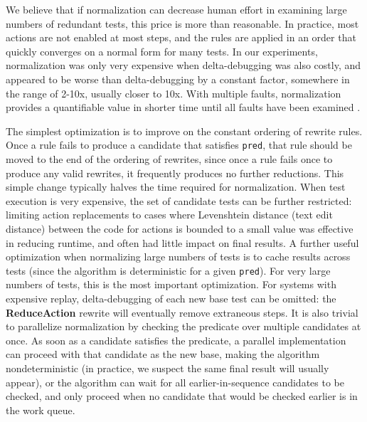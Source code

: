 We believe that if normalization can decrease human effort in
examining large numbers of redundant tests, this price is more
than reasonable.  In practice, most actions are not enabled at most
steps, and the rules are applied in an order that quickly converges on
a normal form for many tests.  In our experiments, normalization
was only very expensive when delta-debugging was also costly, and
appeared to be worse than delta-debugging by a constant factor,
somewhere in the range of 2-10x, usually closer to 10x.  With multiple
faults, normalization provides a quantifiable value in
shorter time until all faults have been examined \cite{PLDI13}.


The simplest optimization is to improve on the constant ordering of
rewrite rules.  Once a rule fails to produce a candidate that
satisfies {\tt pred}, that rule should be moved to the end of the
ordering of rewrites, since once a rule fails once to produce any
valid rewrites, it frequently produces no further reductions.  This
simple change typically halves the time required for normalization.
When test execution is very expensive, the set of candidate tests can be further restricted: limiting action replacements to cases
where Levenshtein \cite{Lev} distance (text edit distance) between the
code for actions is bounded to a small value was effective in
reducing runtime, and often had little impact on final results.
A further useful optimization when normalizing large numbers of tests
is to cache results across tests (since the algorithm is deterministic
for a given {\tt pred}).   For very large
numbers of tests, this is the most important optimization.
For systems with
expensive replay, delta-debugging of each new base test
can be omitted: the {\bf ReduceAction} rewrite will
eventually remove extraneous steps.  
It is also trivial to parallelize normalization by
checking the predicate over multiple candidates at once.  As soon as a
candidate satisfies the predicate, a parallel implementation can proceed with that candidate as the new
base, making the algorithm nondeterministic (in practice, we suspect
the same final result will usually appear), or the algorithm can wait
for all earlier-in-sequence candidates to be checked, and only proceed
when no candidate that would be checked earlier is in the work queue.

